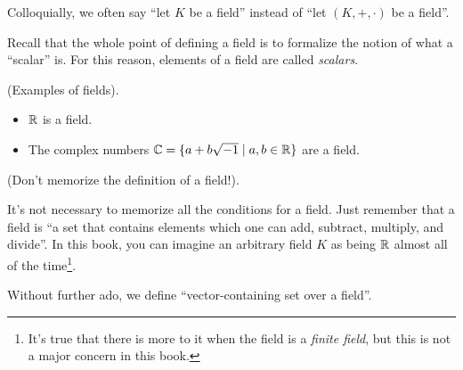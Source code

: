 \begin{defn}
    Colloquially, we often say ``let $K$ be a field'' instead of ``let $(K, +, \cdot)$ be a field''.
    
    Recall that the whole point of defining a field is to formalize the notion of what a ``scalar'' is. For this reason, elements of a field are called \textit{scalars}.
\end{defn}

\begin{remark}
    (Examples of fields).
    
    \begin{itemize}
        \item $\mathbb{R}$ is a field.
        \item The complex numbers $\mathbb{C} = \{ a + b\sqrt{-1} \mid a, b \in \mathbb{R}\}$ are a field.
    \end{itemize}
\end{remark}

\begin{remark}
    (Don't memorize the definition of a field!).
    
    It's not necessary to memorize all the conditions for a field. Just remember that a field is ``a set that contains elements which one can add, subtract, multiply, and divide''. In this book, you can imagine an arbitrary field $K$ as being $\mathbb{R}$ almost all of the time\footnote{It's true that there is more to it when the field is a \textit{finite field}, but this is not a major concern in this book.}.
\end{remark}

Without further ado, we define ``vector-containing set over a field''.

